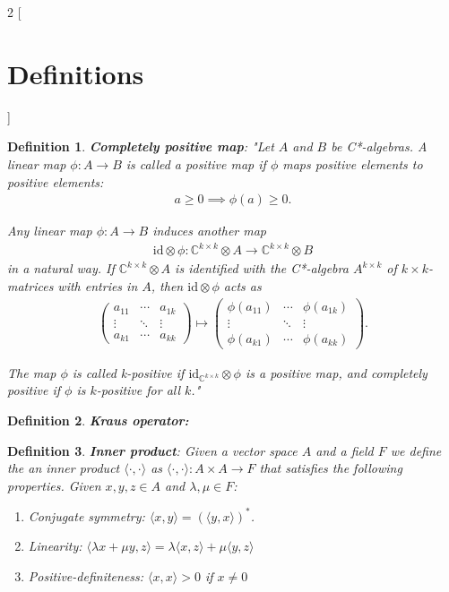 \documentclass[12pt,letterpaper]{article}
\newtheorem{definition}{Definition}
\begin{document}
\begin{multicols}{2}
[
\section{Definitions}
]
\begin{definition}
\textbf{Completely positive map}: "Let $ A $ and $ B $ be C*-algebras. A linear map $ \phi: A \to B $ is called a \textit{positive map} if $ \phi $ maps positive elements to positive elements:
\begin{align}
a \geq 0 \implies \phi(a) \geq 0.
\end{align}

Any linear map $ \phi: A \to B $ induces another map
\begin{align}
\mathrm{id} \otimes \phi : \mathbb{C}^{k \times k} \otimes A \to \mathbb{C}^{k \times k} \otimes B
\end{align}
in a natural way. If $ \mathbb{C}^{k \times k} \otimes A $ is identified with the C*-algebra $ A^{k \times k} $ of $ k \times k $-matrices with entries in $ A $, then $ \mathrm{id} \otimes \phi $ acts as
\begin{align}
\begin{pmatrix}
a_{11} & \cdots & a_{1k} \\
\vdots & \ddots & \vdots \\
a_{k1} & \cdots & a_{kk}
\end{pmatrix}
\mapsto
\begin{pmatrix}
\phi(a_{11}) & \cdots & \phi(a_{1k}) \\
\vdots & \ddots & \vdots \\
\phi(a_{k1}) & \cdots & \phi(a_{kk})
\end{pmatrix}.
\end{align}

The map $ \phi $ is called \textit{k-positive} if $ \mathrm{id}_{\mathbb{C}^{k \times k}} \otimes \phi $ is a positive map, and \textit{completely positive} if $ \phi $ is $ k $-positive for all $ k $."\cite{completely_positive_map_Wikipedia}
\end{definition}
\begin{definition}\textbf{Kraus operator: } 
\end{definition}

\begin{definition}\label{innerProductDefinition}
\textbf{Inner product}: Given a vector space $A$ and a field $F$ we define the an inner product $\langle \cdot , \cdot \rangle$ as $\langle \cdot , \cdot \rangle:A\times A\rightarrow F$ that satisfies the following properties. Given $x,y,z\in A$ and $\lambda,\mu\in F$:
\begin{enumerate}
\item Conjugate symmetry: $\langle x,y\rangle=(\langle y,x\rangle)^*$.
\item Linearity: $\langle \lambda x+\mu y, z\rangle=\lambda\langle  x, z\rangle+\mu\langle  y, z\rangle$
\item Positive-definiteness: $\langle x,x\rangle>0$ if $x\neq0$
\end{enumerate}
\end{definition}


\end{multicols}
\end{document}
